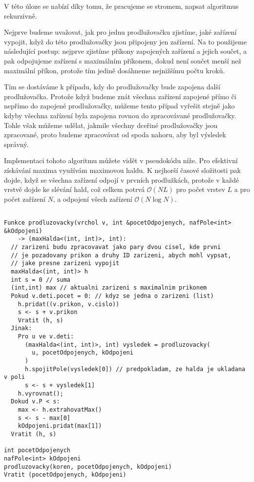 \documentclass{fkssolpub}
\author{Ondřej Sedláček}
\begin{document}
 

V této úloze se nabízí díky tomu, že pracujeme se stromem, napsat algoritmus 
rekurzivně. 

Nejprve budeme uvažovat, jak pro jednu prodlužovačku zjistíme, jaké zařízení
vypojit, když do této prodlužovačky jsou připojeny jen zařízení. Na to
použijeme následující postup: nejprve zjistíme příkony zapojených zařízení
a jejich součet, a pak odpojujeme zařízení s maximálním příkonem,
dokud není součet menší než maximální příkon, protože tím jedině
dosáhneme nejnižšímu počtu kroků.

Tím se dostáváme k případu, kdy do prodlužovačky bude zapojena další
prodlužovačka. Protože když budeme znát všechna zařízení zapojené přímo
či nepřímo do zapojené prodlužovačky, můžeme tento případ vyřešit stejně
jako kdyby všechna zařízení byla zapojena rovnou do zpracovávané
prodlužovačky. Tohle však můžeme udělat, jakmile všechny dceřiné prodlužovačky
jsou zpracované, proto budeme zpracovávat od spoda nahoru, aby byl výsledek
správný.

Implementaci tohoto algoritmu můžete vidět v pseudokódu níže. Pro
efektivní získávání maxima využívám maximovou haldu. K nejhorší
časové složitosti pak dojde, když se všechna zařízení odpojí
v prvních prodlužkách, protože v každé vrstvě dojde ke slévání
hald, což celkem potrvá $\mathcal{O}(N L)$ pro počet vrstev $L$ a pro počet
zařízení $N$, a odpojení všech zařízení $\mathcal{O}(N \log N)$.

\begin{lstlisting}

Funkce prodluzovacky(vrchol v, int &pocetOdpojenych, nafPole<int> &kOdpojeni) 
    -> (maxHalda<(int, int)>, int):
  // zarizeni budu zpracovavat jako pary dvou cisel, kde prvni
  // je pozadovany prikon a druhy ID zarizeni, abych mohl vypsat,
  // jake presne zarizeni vypojit
  maxHalda<(int, int)> h 
  int s = 0 // suma
  (int,int) max // aktualni zarizeni s maximalnim prikonem
  Pokud v.deti.pocet = 0: // kdyz se jedna o zarizeni (list)
    h.pridat((v.prikon, v.cislo))
    s <- s + v.prikon
    Vratit (h, s)
  Jinak:
    Pro u ve v.deti:
      (maxHalda<(int, int)>, int) vysledek = prodluzovacky(
        u, pocetOdpojenych, kOdpojeni
      )
      h.spojitPole(vysledek[0]) // predpokladam, ze halda je ukladana v poli
      s <- s + vysledek[1]
    h.vyrovnat();
  Dokud v.P < s:
    max <- h.extrahovatMax()
    s <- s - max[0]
    kOdpojeni.pridat(max[1])
  Vratit (h, s)

int pocetOdpojenych
nafPole<int> kOdpojeni
prodluzovacky(koren, pocetOdpojenych, kOdpojeni)
Vratit (pocetOdpojenych, kOdpojeni)

\end{lstlisting}
\end{document}
